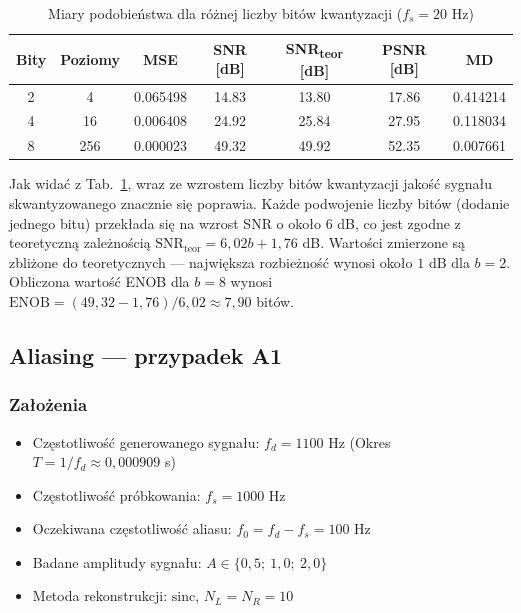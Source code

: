 \documentclass[12pt]{article}
\begin{document}
\begin{table}[H]
    \centering
    \caption{Miary podobieństwa dla różnej liczby bitów kwantyzacji ($f_s = 20$ Hz)}
    \begin{tabular}{ccccccc}
        \toprule
        \textbf{Bity} & \textbf{Poziomy} & \textbf{MSE} & \textbf{SNR [dB]} & \textbf{SNR\textsubscript{teor} [dB]} & \textbf{PSNR [dB]} & \textbf{MD} \\
        \midrule
        2 & 4   & 0.065498 & 14.83 & 13.80 & 17.86 & 0.414214 \\
        4 & 16  & 0.006408 & 24.92 & 25.84 & 27.95 & 0.118034 \\
        8 & 256 & 0.000023 & 49.32 & 49.92 & 52.35 & 0.007661 \\
        \bottomrule
    \end{tabular}
    \label{tab:quantization}
\end{table}

Jak widać z Tab.~\ref{tab:quantization}, wraz ze wzrostem liczby bitów kwantyzacji
jakość sygnału skwantyzowanego znacznie się poprawia. Każde podwojenie liczby bitów
(dodanie jednego bitu) przekłada się na wzrost SNR o około $6$ dB, co jest zgodne
z teoretyczną zależnością $\text{SNR}_\text{teor} = 6{,}02b + 1{,}76$ dB.
Wartości zmierzone są zbliżone do teoretycznych --- największa rozbieżność
wynosi około $1$ dB dla $b=2$.
Obliczona wartość ENOB dla $b=8$ wynosi
$\text{ENOB} = (49{,}32 - 1{,}76) / 6{,}02 \approx 7{,}90$ bitów.

\subsection{Aliasing --- przypadek A1}

\subsubsection{Założenia}

\begin{itemize}
    \item Częstotliwość generowanego sygnału: $f_d = 1100$ Hz (Okres $T = 1/f_d \approx 0{,}000909$ s)
    \item Częstotliwość próbkowania: $f_s = 1000$ Hz
    \item Oczekiwana częstotliwość aliasu: $f_0 = f_d - f_s = 100$ Hz
    \item Badane amplitudy sygnału: $A \in \{0{,}5;\ 1{,}0;\ 2{,}0\}$
    \item Metoda rekonstrukcji: $\text{sinc}$, $N_L = N_R = 10$
\end{itemize}
\end{document}

